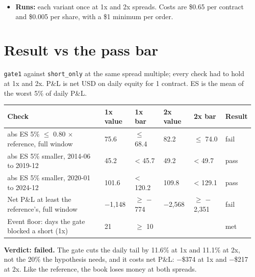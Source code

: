 \documentclass{article}
\begin{document}
\begin{itemize}
\begin{itemize}
\item Reference \texttt{short\_\allowbreak{}only}: the registered runs of \texttt{2026-\allowbreak{}10-\allowbreak{}16-\allowbreak{}short-\allowbreak{}only/\allowbreak{}short\_\allowbreak{}only}, not rerun. With the gate off, the current engine reproduces that run's equity exactly.

\end{itemize}

\item \textbf{Runs:} each variant once at 1x and 2x spreads. Costs are \$0.65 per contract and \$0.005 per share, with a \$1 minimum per order.

\end{itemize}

\section{Result vs the pass bar}

\texttt{gate1} against \texttt{short\_\allowbreak{}only} at the same spread multiple; every check had to hold at 1x and 2x. P\&L is net USD on daily equity for 1 contract. ES is the mean of the worst 5\% of daily P\&L.

\begin{center}\small
\begin{tabularx}{\linewidth}{>{\raggedright\arraybackslash}X l l l l l}
\toprule
\textbf{Check} & \textbf{1x value} & \textbf{1x bar} & \textbf{2x value} & \textbf{2x bar} & \textbf{Result} \\
\midrule
abs ES 5\% \ensuremath{\leq} 0.80 \ensuremath{\times} reference, full window & 75.6 & \ensuremath{\leq} 68.4 & 82.2 & \ensuremath{\leq} 74.0 & fail \\
abs ES 5\% smaller, 2014-06 to 2019-12 & 45.2 & < 45.7 & 49.2 & < 49.7 & pass \\
abs ES 5\% smaller, 2020-01 to 2024-12 & 101.6 & < 120.2 & 109.8 & < 129.1 & pass \\
Net P\&L at least the reference's, full window & \ensuremath{-}1,148 & \ensuremath{\geq} \ensuremath{-}774 & \ensuremath{-}2,568 & \ensuremath{\geq} \ensuremath{-}2,351 & fail \\
Event floor: days the gate blocked a short (1x) & 21 & \ensuremath{\geq} 10 &  &  & met \\
\bottomrule
\end{tabularx}
\end{center}

\textbf{Verdict: failed.} The gate cuts the daily tail by 11.6\% at 1x and 11.1\% at 2x, not the 20\% the hypothesis needs, and it costs net P\&L: \ensuremath{-}\$374 at 1x and \ensuremath{-}\$217 at 2x. Like the reference, the book loses money at both spreads.
\end{document}
